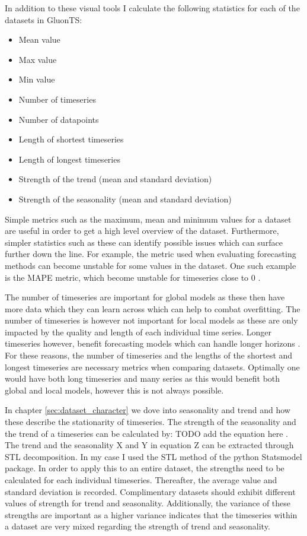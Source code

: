 In addition to these visual tools I calculate the following statistics for each of the datasets in GluonTS:

\begin{itemize}
  \item Mean value
  \item Max value
  \item Min value
  \item Number of timeseries
  \item Number of datapoints
  \item Length of shortest timeseries
  \item Length of longest timeseries
  \item Strength of the trend (mean and standard deviation)
  \item Strength of the seasonality (mean and standard deviation)
\end{itemize}

Simple metrics such as the maximum, mean and minimum values for a dataset are useful in order to get a high level overview of the dataset. Furthermore, simpler statistics such as these can identify possible issues which can surface further down the line. For example, the metric used when evaluating forecasting methods can become unstable for some values in the dataset. One such example is the MAPE metric, which become unstable for timeseries close to 0 \cite{hyndman_forecasting_3rd}.

The number of timeseries are important for global models as these then have more data which they can learn across which can help to combat overfitting. The number of timeseries is however not important for local models as these are only impacted by the quality and length of each individual time series. Longer timeseries however, benefit forecasting models which can handle longer horizons \cite{makridakis_m4_2020}. For these reasons, the number of timeseries and the lengths of the shortest and longest timeseries are necessary metrics when comparing datasets. Optimally one would have both long timeseries and many series as this would benefit both global and local models, however this is not always possible.

In chapter \ref{sec:dataset_character} we dove into seasonality and trend and how these describe the stationarity of timeseries. The strength of the seasonality and the trend of a timeseries can be calculated by: TODO add the equation here \cite{hyndman_forecasting_3rd}. The trend and the seasonality X and Y in equation Z can be extracted through STL decomposition. In my case I used the STL method of the python Statsmodel package. In order to apply this to an entire dataset, the strengths need to be calculated for each individual timeseries. Thereafter, the average value and standard deviation is recorded. Complimentary datasets should exhibit different values of strength for trend and seasonality. Additionally, the variance of these strengths are important as a higher variance indicates that the timeseries within a dataset are very mixed regarding the strength of trend and seasonality.

